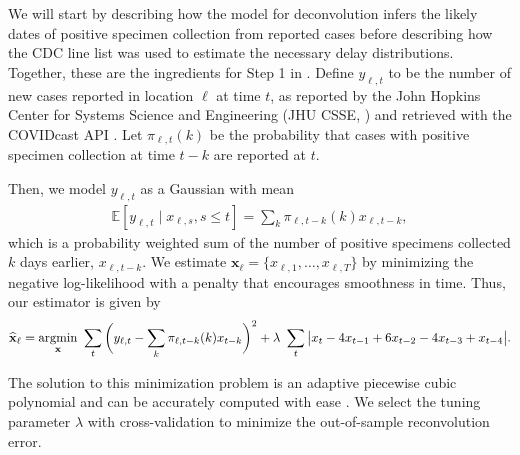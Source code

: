 \begin{linenomath*} 
We will start by describing how the model for deconvolution infers the likely
dates of positive specimen collection from reported cases before describing how
the CDC line list \citep{cdc2020caserestr} 
was used to estimate the necessary delay distributions. Together,
these are the ingredients for Step 1 in .
Define $y_{\ell,t}$ to be the number of new cases reported in location $\ell$ at
time $t$, as reported by the John Hopkins Center for Systems Science and
Engineering (JHU CSSE, \citealp{dong2020interactive}) and retrieved with the
COVIDcast API \citep{reinhart2021open}. Let $\pi_{\ell,t}(k)$ be the probability
that cases with positive specimen collection at time $t-k$ are reported at $t$. 
\end{linenomath*} 
\begin{linenomath*} 
Then, we
model $y_{\ell,t}$ as a Gaussian with mean 
\begin{align}
  \mathbb{E}[y_{\ell,t} \mid x_{\ell,s}, s \leq t ] =\sum_{k} \pi_{\ell,t-k}(k)x_{\ell,t-k},
  \label{eq:cases-model}
\end{align}
which is a probability weighted sum of the number of positive specimens
collected $k$ days earlier, $x_{\ell,t-k}$.
We estimate $\mathbf{x}_\ell = \{x_{\ell,1},\ldots,x_{\ell,T}\}$ by minimizing
the negative log-likelihood with a penalty that encourages smoothness in time.
Thus, our estimator is given by
\begin{align}
  \widehat{\mathbf{x}}_\ell = \operatorname*{argmin}_{\mathbf{x}}\ \sum_{t}
  \bigg( y_{\ell,t} -  \sum_k \pi_{\ell,t-k}(k) x_{t-k} \bigg)^2 
  + \lambda\ \sum_t \big|x_t - 4x_{t-1} + 6x_{t-2} -4x_{t-3}+ x_{t-4}\big|.
  \label{eq:cases-deconvolved}
\end{align}
\end{linenomath*} 
The solution to this minimization
problem is an adaptive piecewise cubic polynomial \citep{tibshirani2014adaptive,
tibshirani2022divided} and can be accurately computed with ease
\citep{ramdas2016fast,jahja2022real}. We select the tuning parameter
$\lambda$ with cross-validation
to minimize the out-of-sample reconvolution error. 

